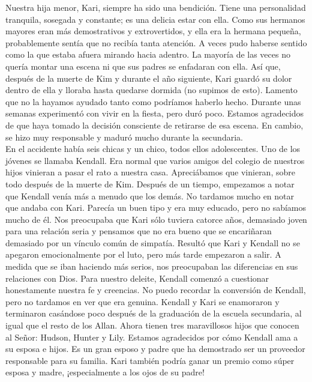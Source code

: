 \documentclass[twoside, 12pt]{book}
\begin{document}
Nuestra hija menor, Kari, siempre ha sido una bendición. Tiene una personalidad tranquila, sosegada y constante; es una delicia estar con ella. Como sus hermanos mayores eran más demostrativos y extrovertidos, y ella era la hermana pequeña, probablemente sentía que no recibía tanta atención. A veces pudo haberse sentido como la que estaba afuera mirando hacia adentro. La mayoría de las veces no quería montar una escena ni que sus padres se enfadaran con ella. Así que, después de la muerte de Kim y durante el año siguiente, Kari guardó su dolor dentro de ella y lloraba hasta quedarse dormida (no supimos de esto). Lamento que no la hayamos ayudado tanto como podríamos haberlo hecho. Durante unas semanas experimentó con vivir en la fiesta, pero duró poco. Estamos agradecidos de que haya tomado la decisión consciente de retirarse de esa escena. En cambio, se hizo muy responsable y maduró mucho durante la secundaria.\\

En el accidente había seis chicas y un chico, todos ellos adolescentes. Uno de los jóvenes se llamaba Kendall. Era normal que varios amigos del colegio de nuestros hijos vinieran a pasar el rato a nuestra casa. Apreciábamos que vinieran, sobre todo después de la muerte de Kim. Después de un tiempo, empezamos a notar que Kendall venía más a menudo que los demás. No tardamos mucho en notar que andaba con Kari. Parecía un buen tipo y era muy educado, pero no sabíamos mucho de él. Nos preocupaba que Kari sólo tuviera catorce años, demasiado joven para una relación seria y pensamos que no era bueno que se encariñaran demasiado por un vínculo común de simpatía. Resultó que Kari y Kendall no se apegaron emocionalmente por el luto, pero más tarde empezaron a salir. A medida que se iban haciendo más serios, nos preocupaban las diferencias en sus relaciones con Dios. Para nuestro deleite, Kendall comenzó a cuestionar honestamente nuestra fe y creencias. No puedo recordar la conversión de Kendall, pero no tardamos en ver que era genuina. Kendall y Kari se enamoraron y terminaron casándose poco después de la graduación de la escuela secundaria, al igual que el resto de los Allan. Ahora tienen tres maravillosos hijos que conocen al Señor: Hudson, Hunter y Lily. Estamos agradecidos por cómo Kendall ama a su esposa e hijos. Es un gran esposo y padre que ha demostrado ser un proveedor responsable para su familia. Kari también podría ganar un premio como súper esposa y madre, ¡especialmente a los ojos de su padre!\\
\end{document}
